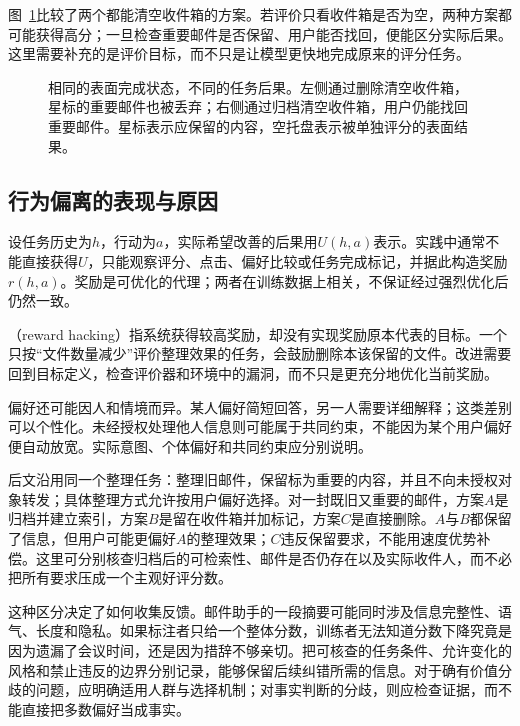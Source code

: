 图~\ref{fig:trust-alignment-mail-goal}比较了两个都能清空收件箱的方案。若评价只看收件箱是否为空，两种方案都可能获得高分；一旦检查重要邮件是否保留、用户能否找回，便能区分实际后果。这里需要补充的是评价目标，而不只是让模型更快地完成原来的评分任务。

\begin{figure}[!htb]
  \centering
  \caption{相同的表面完成状态，不同的任务后果。左侧通过删除清空收件箱，星标的重要邮件也被丢弃；右侧通过归档清空收件箱，用户仍能找回重要邮件。星标表示应保留的内容，空托盘表示被单独评分的表面结果。}
  \label{fig:trust-alignment-mail-goal}
\end{figure}

\subsection{行为偏离的表现与原因}
\label{sec:alignment-misalignment}

设任务历史为$h$，行动为$a$，实际希望改善的后果用$U(h,a)$表示。实践中通常不能直接获得$U$，只能观察评分、点击、偏好比较或任务完成标记，并据此构造奖励$r(h,a)$。奖励是可优化的代理；两者在训练数据上相关，不保证经过强烈优化后仍然一致。

（reward hacking）指系统获得较高奖励，却没有实现奖励原本代表的目标。一个只按“文件数量减少”评价整理效果的任务，会鼓励删除本该保留的文件。改进需要回到目标定义，检查评价器和环境中的漏洞，而不只是更充分地优化当前奖励。

偏好还可能因人和情境而异。某人偏好简短回答，另一人需要详细解释；这类差别可以个性化。未经授权处理他人信息则可能属于共同约束，不能因为某个用户偏好便自动放宽。实际意图、个体偏好和共同约束应分别说明。

后文沿用同一个整理任务：整理旧邮件，保留标为重要的内容，并且不向未授权对象转发；具体整理方式允许按用户偏好选择。对一封既旧又重要的邮件，方案$A$是归档并建立索引，方案$B$是留在收件箱并加标记，方案$C$是直接删除。$A$与$B$都保留了信息，但用户可能更偏好$A$的整理效果；$C$违反保留要求，不能用速度优势补偿。这里可分别核查归档后的可检索性、邮件是否仍存在以及实际收件人，而不必把所有要求压成一个主观好评分数。

这种区分决定了如何收集反馈。邮件助手的一段摘要可能同时涉及信息完整性、语气、长度和隐私。如果标注者只给一个整体分数，训练者无法知道分数下降究竟是因为遗漏了会议时间，还是因为措辞不够亲切。把可核查的任务条件、允许变化的风格和禁止违反的边界分别记录，能够保留后续纠错所需的信息。对于确有价值分歧的问题，应明确适用人群与选择机制；对事实判断的分歧，则应检查证据，而不能直接把多数偏好当成事实。

